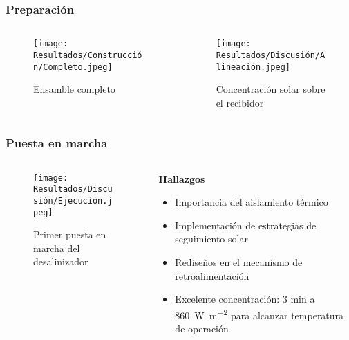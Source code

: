 \begin{frame}
	\frametitle{Preparación}
	\begin{columns}
		\begin{column}{0.5\linewidth}
			\begin{figure}
				\centering
				\texttt{[image: Resultados/Construcción/Completo.jpeg]}
				\caption{Ensamble completo}
			\end{figure}
		\end{column}
		\begin{column}{0.5\linewidth}
			\begin{figure}
				\centering
				\texttt{[image: Resultados/Discusión/Alineación.jpeg]}
				\caption{Concentración solar sobre el recibidor}
			\end{figure}
		\end{column}
	\end{columns}
\end{frame}

\begin{frame}
	\frametitle{Puesta en marcha}
	\begin{columns}
		\begin{column}{0.5\linewidth}
			\begin{figure}
				\centering
				\texttt{[image: Resultados/Discusión/Ejecución.jpeg]}
				\caption{Primer puesta en marcha del desalinizador}
			\end{figure}
		\end{column}
		\begin{column}{0.5\linewidth}
			\textbf{Hallazgos}
			
			\begin{itemize}
				\item Importancia del aislamiento térmico
				\item Implementación de estrategias de seguimiento solar
				\item Rediseños en el mecanismo de retroalimentación
				\item Excelente concentración: 3 min a \qty{860}{\watt\per\m\tothe{2}} para alcanzar temperatura de operación
			\end{itemize}
		\end{column}
	\end{columns}
\end{frame}

